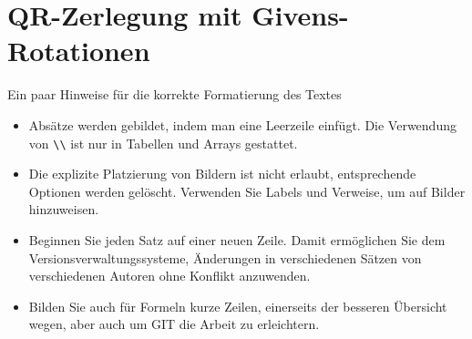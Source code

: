 %
%
%
\chapter{QR-Zerlegung mit Givens-Rotationen\label{chapter:qr}}
\begin{refsection}

Ein paar Hinweise für die korrekte Formatierung des Textes
\begin{itemize}
\item
Absätze werden gebildet, indem man eine Leerzeile einfügt.
Die Verwendung von \verb+\\+ ist nur in Tabellen und Arrays gestattet.
\item
Die explizite Platzierung von Bildern ist nicht erlaubt, entsprechende
Optionen werden gelöscht. 
Verwenden Sie Labels und Verweise, um auf Bilder hinzuweisen.
\item
Beginnen Sie jeden Satz auf einer neuen Zeile. 
Damit ermöglichen Sie dem Versionsverwaltungssysteme, Änderungen
in verschiedenen Sätzen von verschiedenen Autoren ohne Konflikt 
anzuwenden.
\item 
Bilden Sie auch für Formeln kurze Zeilen, einerseits der besseren
Übersicht wegen, aber auch um GIT die Arbeit zu erleichtern.
\end{itemize}






\printbibliography[heading=subbibliography]
\end{refsection}
